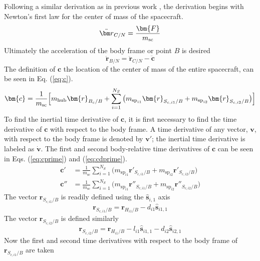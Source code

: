 Following a similar derivation as in previous work \cite{Allard2016rz}, the derivation begins with Newton's first law for the center of mass of the spacecraft.
\begin{equation}
	\ddot{\bm r}_{C/N} = \frac{\bm{F}}{m_{\text{\text{sc}}}}
	\label{eq:Newtons1Law}
\end{equation}
Ultimately the acceleration of the body frame or point $B$ is desired
\begin{equation}
	\ddot{\bm r}_{B/N} = \ddot{\bm r}_{C/N}-\ddot{\bm c}
	\label{eq:RcRbacc}
\end{equation}
The definition of $\bm{c}$ the location of the center of mass of the entire spacecraft, can be seen in Eq. (\ref{eq:c}).
\begin{equation}
	\bm{c} = \frac{1}{m_{\text{sc}}}\Big[m_{\text{\text{hub}}}\bm{r}_{B_{c}/B} +\sum_{i=1}^{N_{S}}\big(m_{\text{sp}_{i1}}\bm{r}_{S_{c,i1}/B}+m_{\text{sp}_{i2}}\bm{r}_{S_{c,i2}/B}\big)\Big]
	\label{eq:c}
\end{equation}
To find the inertial time derivative of $\bm{c}$, it is first necessary to find the time derivative of $\bm{c}$ with respect to the body frame. A time derivative of any vector, $\bm{v}$, with respect to the body frame is denoted by $\bm{v}'$; the inertial time derivative is labeled as $\dot{\bm{v}}$. The first and second body-relative time derivatives of $\bm{c}$ can be seen in Eqs. (\ref{eq:cprime}) and (\ref{eq:cdprime}).
\begin{align}
	\bm{c}' &= \frac{1}{m_{\text{sc}}}\sum_{i=1}^{N_{S}}\big(m_{\text{sp}_{i1}}\bm{r}'_{S_{c,i1}/B}+m_{\text{sp}_{i2}}\bm{r}'_{S_{c,i2}/B}\big)
	\label{eq:cprime}
	\\
	\bm{c}'' &= \frac{1}{m_{\text{sc}}}\sum_{i=1}^{N_{S}}\big(m_{\text{sp}_{i1}}\bm{r}''_{S_{c,i1}/B}+m_{\text{sp}_{i2}}\bm{r}''_{S_{c,i2}/B}\big)
	\label{eq:cdprime}
\end{align}
The vector $\bm{r}_{S_{c,i1}/B}$ is readily defined using the $\hat{\bm{s}}_{i,1}$ axis
\begin{equation}
	\bm{r}_{S_{c,{i1}}/B} = 	\bm{r}_{H_{i1}/B} -d_{i1} \bm{\hat{s}}_{i1,1}
	\label{eq:rcgspi1}
\end{equation}
The vector $\bm{r}_{S_{c,i2}/B}$ is defined similarly
\begin{equation}
	\bm{r}_{S_{c,{i2}}/B} = 	\bm{r}_{H_{i1}/B} -l_{i1} \bm{\hat{s}}_{i1,1} - d_{i2}\bm{\hat{s}}_{i2,1}
	\label{eq:rcgspi2}
\end{equation}
Now the first and second time derivatives with respect to the body frame of $\bm{r}_{S_{c,i1}/B}$ are taken
